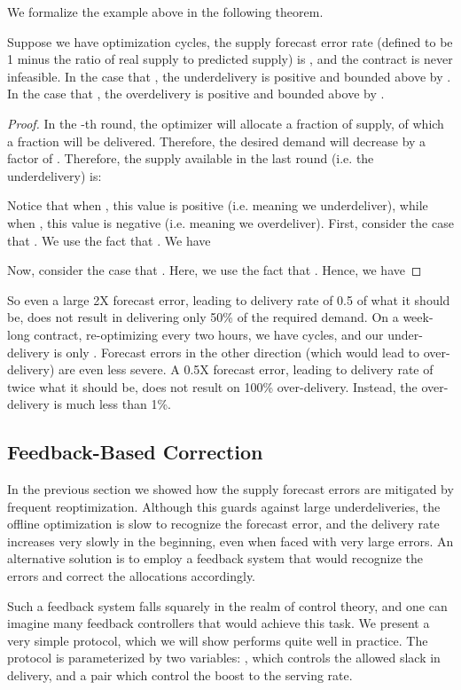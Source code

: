 We formalize the example above in the following theorem.
\begin{theorem}
Suppose we have  optimization cycles, the supply forecast error rate (defined
to be 1 minus the ratio of real supply to predicted supply) is , and the contract is never infeasible.
In the case that , the underdelivery is positive and bounded above by .
In the case that , the overdelivery is positive and bounded above by .
\end{theorem}
\begin{proof}
In the -th round, the optimizer will allocate a  fraction of
supply, of which a  fraction will be delivered. Therefore, the desired demand
will decrease by a factor of . Therefore, the supply available
 in the last round (i.e. the underdelivery) is:

Notice that when , this value is positive (i.e. meaning we underdeliver), while
when , this value is negative (i.e. meaning we overdeliver).
First, consider the case that .  We use the fact that
.
We have

Now,
consider the case that .  Here, we use the fact that .
Hence, we have

\end{proof}
So even a large 2X forecast error, leading to delivery rate of 0.5 of what it should be, does not result in delivering only 50\% of
the required demand.  On a week-long contract, re-optimizing every two hours, we have  cycles, and our under-delivery
is only .  Forecast errors in the other direction (which would lead to over-delivery) are even less severe.
A 0.5X forecast error, leading to delivery rate of twice what it should be, does not result on 100\% over-delivery.
Instead, the over-delivery is much less than 1\%.

\subsection{Feedback-Based Correction}
\label{sec:feedback}
In the previous section we showed how the supply forecast errors are mitigated by frequent reoptimization.
Although this guards against large underdeliveries, the offline optimization is slow to recognize the forecast error,
and the delivery rate increases very slowly in the beginning, even when faced with very large errors. An alternative solution is to
employ a feedback system that would recognize the errors and correct the allocations accordingly.

Such a feedback system falls squarely in the realm of control theory, and one can imagine many feedback controllers that would achieve this task.
We present a very simple protocol, which we will show performs quite well in practice.  The protocol is parameterized by two variables: , which
controls the allowed slack in delivery, and a pair  which control the boost to the serving rate.

